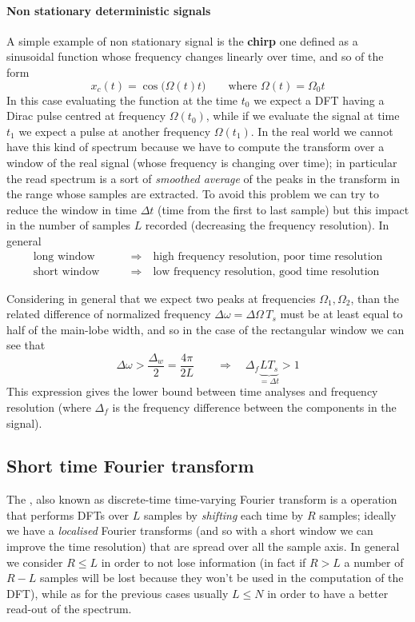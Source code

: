 	\paragraph{Non stationary deterministic signals} A simple example of non stationary signal is the \textbf{chirp} one defined as a sinusoidal function whose frequency changes linearly over time, and so of the form
	\[ x_c(t) = \cos\big(\Omega(t) t\big)  \qquad \textrm{where } \Omega(t) = \Omega_0t \]
	In this case evaluating the function at the time $t_0$ we expect a DFT having a Dirac pulse centred at frequency $\Omega(t_0)$, while if we evaluate the signal at time $t_1$ we expect a pulse at another frequency $\Omega(t_1)$. In the real world we cannot have this kind of spectrum because we have to compute the transform over a window of the real signal (whose frequency is changing over time); in particular the read spectrum is a sort of \textit{smoothed average} of the peaks in the transform in the range whose samples are extracted. To avoid this problem we can try to reduce the window in time $\Delta t$ (time from the first to last sample) but this impact in the number of samples $L$ recorded (decreasing the frequency resolution). In general
	\begin{align*}
		\textrm{long window} \qquad &\Rightarrow \quad \textrm{high frequency resolution, poor time resolution} \\
		\textrm{short window} \qquad &\Rightarrow \quad \textrm{low frequency resolution, good time resolution}
	\end{align*}
	
	Considering in general that we expect two peaks at frequencies $\Omega_1,\Omega_2$, than the related difference of normalized frequency $\Delta \omega = \Delta \Omega \, T_s$ must be at least equal to half of the main-lobe width, and so in the case of the rectangular window we can see that
	\[ \Delta \omega > \frac{\Delta_w}{2} = \frac{4\pi}{2L} \qquad \Rightarrow \quad \Delta_f \underbrace{L T_s}_{=\Delta t} > 1   \]
	This expression gives the lower bound between time analyses and frequency resolution (where $\Delta_f$ is the frequency difference between the components in the signal).
	
\subsection{Short time Fourier transform}
	The , also known as discrete-time time-varying Fourier transform is a operation that performs DFTs over $L$ samples by \textit{shifting} each time by $R$ samples; ideally we have a \textit{localised} Fourier transforms (and so with a short window we can improve the time resolution) that are spread over all the sample axis. In general we consider $R\leq L$ in order to not lose information (in fact if $R>L$ a number of $R-L$ samples will be lost because they won't be used in the computation of the DFT), while as for the previous cases usually $L\leq N$ in order to have a better read-out of the spectrum.
	
